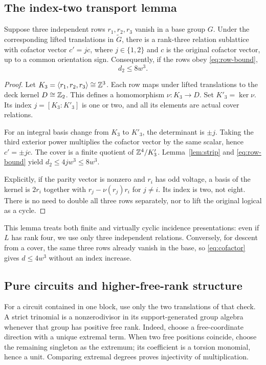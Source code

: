 \subsection{The index-two transport lemma}
\begin{lemma}\label{lem:transport}
Suppose three independent rows $r_1,r_2,r_3$ vanish in a base group $G$. Under the corresponding lifted translations in $\widetilde G$, there is a rank-three relation sublattice with cofactor vector $c'=jc$, where $j\in\{1,2\}$ and $c$ is the original cofactor vector, up to a common orientation sign. Consequently, if the rows obey \eqref{eq:row-bound},
\begin{equation}\label{eq:transport}
 d_2\le8w^3.
\end{equation}
\end{lemma}
\begin{proof}
Let $K_3=\langle r_1,r_2,r_3\rangle\cong\mathbb Z^3$. Each row maps under lifted translations to the deck kernel $D\cong\mathbb Z_2$. This defines a homomorphism $\nu:K_3\to D$. Set $K'_3=\ker\nu$. Its index $j=[K_3:K'_3]$ is one or two, and all its elements are actual cover relations.

For an integral basis change from $K_3$ to $K'_3$, the determinant is $\pm j$. Taking the third exterior power multiplies the cofactor vector by the same scalar, hence $c'=\pm jc$. The cover is a finite quotient of $\mathbb Z^4/K'_3$. Lemma~\ref{lem:strip} and \eqref{eq:row-bound} yield $d_2\le4jw^3\le8w^3$.

Explicitly, if the parity vector is nonzero and $r_i$ has odd voltage, a basis of the kernel is $2r_i$ together with $r_j-\nu(r_j)r_i$ for $j\ne i$. Its index is two, not eight. There is no need to double all three rows separately, nor to lift the original logical as a cycle.
\end{proof}
This lemma treats both finite and virtually cyclic incidence presentations: even if $L$ has rank four, we use only three independent relations. Conversely, for descent from a cover, the same three rows already vanish in the base, so \eqref{eq:cofactor} gives $d\le4w^3$ without an index increase.

\subsection{Pure circuits and higher-free-rank structure}
For a circuit contained in one block, use only the two translations of that check. A strict trinomial is a nonzerodivisor in its support-generated group algebra whenever that group has positive free rank. Indeed, choose a free-coordinate direction with a unique extremal term. When two free positions coincide, choose the remaining singleton as the extremum; its coefficient is a torsion monomial, hence a unit. Comparing extremal degrees proves injectivity of multiplication.

